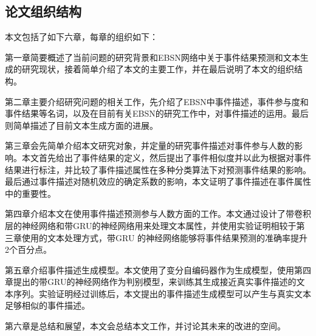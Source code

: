 \subsection{论文组织结构}
本文包括了如下六章，每章的组织如下：

第一章简要概述了当前问题的研究背景和EBSN网络中关于事件结果预测和文本生成的研究现状，接着简单介绍了本文的主要工作，并在最后说明了本文的组织结构。

第二章主要介绍研究问题的相关工作，先介绍了EBSN中事件描述，事件参与度和事件结果等名词，以及在目前有关EBSN的研究工作中，对事件描述的运用。最后则简单描述了目前文本生成方面的进展。 

第三章会先简单介绍本文研究对象，并定量的研究事件描述对事件参与人数的影响。本文首先给出了事件结果的定义，然后提出了事件相似度并以此为根据对事件结果进行标注，并比较了事件描述属性在多种分类算法下对预测事件结果的影响。最后通过事件描述对随机效应的确定系数的影响，本文证明了事件描述在事件属性中的重要性。

第四章介绍本文在使用事件描述预测参与人数方面的工作。本文通过设计了带卷积层的神经网络和带GRU的神经网络用来处理文本属性，并使用实验证明相较于第三章使用的文本处理方式，带GRU 的神经网络能够将事件结果预测的准确率提升2个百分点。

第五章介绍事件描述生成模型。本文使用了变分自编码器作为生成模型，使用第四章提出的带GRU的神经网络作为判别模型，来训练其生成接近真实事件描述的文本序列。实验证明经过训练后，本文提出的事件描述生成模型可以产生与真实文本足够相似的事件描述。

第六章是总结和展望，本文会总结本文工作，并讨论其未来的改进的空间。


%  

